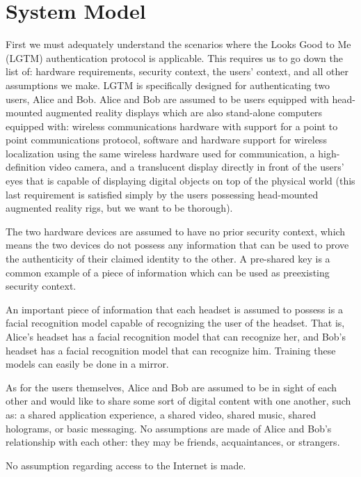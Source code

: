 \documentclass[12pt]{report}
\begin{document}
\section{System Model}
First we must adequately understand the scenarios where the Looks Good to Me (LGTM) authentication protocol is applicable. This requires us to go down the list of: hardware requirements, security context, the users' context, and all other assumptions we make. 
LGTM is specifically designed for authenticating two users, Alice and Bob. Alice and Bob are assumed to be users equipped with head-mounted augmented reality displays which are also stand-alone computers equipped with: wireless communications hardware with support for a point to point communications protocol, software and hardware support for wireless localization using the same wireless hardware used for communication, a high-definition video camera, and a translucent display directly in front of the users' eyes that is capable of displaying digital objects on top of the physical world (this last requirement is satisfied simply by the users possessing head-mounted augmented reality rigs, but we want to be thorough). \par

The two hardware devices are assumed to have no prior security context, which means the two devices do not possess any information that can be used to prove the authenticity of their claimed identity to the other. A pre-shared key is a common example of a piece of information which can be used as preexisting security context. \par

An important piece of information that each headset is assumed to possess is a facial recognition model capable of recognizing the user of the headset. That is, Alice's headset has a facial recognition model that can recognize her, and Bob's headset has a facial recognition model that can recognize him. Training these models can easily be done in a mirror. \par

As for the users themselves, Alice and Bob are assumed to be in sight of each other and would like to share some sort of digital content with one another, such as: a shared application experience, a shared video, shared music, shared holograms, or basic messaging. No assumptions are made of Alice and Bob's relationship with each other: they may be friends, acquaintances, or strangers. \par

No assumption regarding access to the Internet is made. \par
\end{document}
